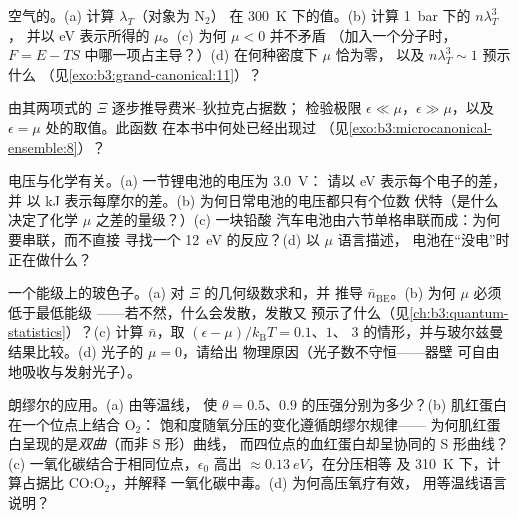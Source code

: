 \begin{exercise}[$\star$]\label{exo:b3:grand-canonical:2}
空气的。(a) 计算 $\lambda_T$（对象为 N$_2$）
在 \qty{300}{K} 下的值。(b) 计算 \qty{1}{bar} 下的 $n\lambda_T^3$，
并以 eV 表示所得的 $\mu$。(c) 为何 $\mu < 0$ 并不矛盾
（加入一个分子时，$F = E - TS$ 中哪一项占主导？）(d)
在何种密度下 $\mu$ 恰为零，
以及 $n\lambda_T^3 \sim 1$ 预示什么
（见\cref{exo:b3:grand-canonical:11}）？
\end{exercise}

\begin{exercise}[$\star$]\label{exo:b3:grand-canonical:3}
由其两项式的 $\Xi$ 逐步推导费米–狄拉克占据数；
检验极限 $\epsilon \ll \mu$，$\epsilon \gg
\mu$，以及 $\epsilon = \mu$ 处的取值。此函数
在本书中何处已经出现过
（见\cref{exo:b3:microcanonical-ensemble:8}）？
\end{exercise}

\begin{exercise}[$\star$]\label{exo:b3:grand-canonical:4}
电压与化学有关。(a) 一节锂电池的电压为 \qty{3.0}{V}：
请以 eV 表示每个电子的差，并
以 kJ 表示每摩尔的差。(b) 为何日常电池的电压都只有个位数
伏特（是什么决定了化学 $\mu$ 之差的量级？）(c) 一块铅酸
汽车电池由六节单格串联而成：为何要串联，而不直接
寻找一个 \qty{12}{eV} 的反应？(d) 以 $\mu$ 语言描述，
电池在“没电”时正在做什么？
\end{exercise}

\begin{exercise}[$\star\star$]\label{exo:b3:grand-canonical:5}
一个能级上的玻色子。(a) 对 $\Xi$ 的几何级数求和，并
推导 $\bar n_{\text{BE}}$。(b) 为何 $\mu$ 必须低于最低能级
——若不然，什么会发散，发散又
预示了什么（见\cref{ch:b3:quantum-statistics}）？(c) 计算
$\bar n$，取 $(\epsilon - \mu)/k_{\text{B}}T = 0.1$、$1$、
$3$ 的情形，并与玻尔兹曼结果比较。(d) 光子的 $\mu = 0$，请给出
物理原因（光子数不守恒——器壁
可自由地吸收与发射光子）。
\end{exercise}

\begin{exercise}[$\star\star$]\label{exo:b3:grand-canonical:6}
朗缪尔的应用。(a) 由等温线，
使 $\theta = 0.5$、$0.9$ 的压强分别为多少？(b) 肌红蛋白在一个位点上结合 O$_2$：
饱和度随氧分压的变化遵循朗缪尔规律——
为何肌红蛋白呈现的是\emph{双曲}（而非 S 形）曲线，
而四位点的血红蛋白却呈协同的 S 形曲线？
(c) 一氧化碳结合于相同位点，$\epsilon_0$
高出 $\approx\qty{0.13}{eV}$，在分压相等
及 \qty{310}{K} 下，计算占据比 CO:O$_2$，并解释
一氧化碳中毒。(d) 为何高压氧疗有效，
用等温线语言说明？
\end{exercise}

